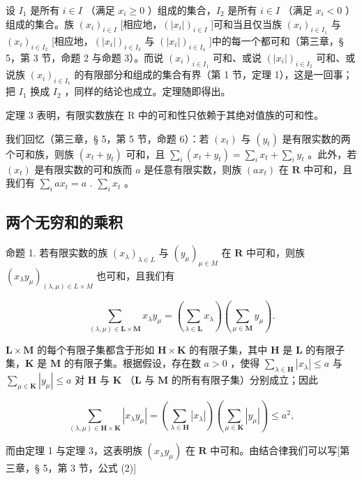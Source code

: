 设 \(I_1\) 是所有 \(i \in I\) （满足 \(x_i \geq 0\) ）组成的集合，\(I_2\) 是所有 \(i \in I\) （满足 \(x_i < 0\) ）组成的集合。族 \((x_i)_{i \in I}\) {[}相应地，\((|x_i|)_{i \in I}\) {]}可和当且仅当族 \((x_i)_{i \in I_1}\) 与 \((x_i)_{i \in I_2}\) {[}相应地，\((|x_i|)_{i \in I_3}\) 与 \((|x_i|)_{i \in I_4}\) {]}中的每一个都可和（第三章，§ 5，第 3 节，命题 2 与命题 3）。而说 \((x_i)_{i \in I_1}\) 可和、或说 \((|x_i|)_{i \in I_2}\) 可和、或说族 \((x_{i})_{i\in I_1}\) 的有限部分和组成的集合有界（第 1 节，定理 1），这是一回事；把 \(I_1\) 换成 \(I_2\) ，同样的结论也成立。定理随即得出。

定理 3 表明，有限实数族在 R 中的可和性只依赖于其绝对值族的可和性。

我们回忆（第三章，§ 5，第 5 节，命题 6）：若 \((x_{t})\) 与 \((y_{t})\) 是有限实数的两个可和族，则族 \((x_{t} + y_{t})\) 可和，且 \(\sum_{i}(x_{t} + y_{t}) = \sum_{i}x_{t} + \sum_{i}y_{t}\) 。此外，若 \((x_{t})\) 是有限实数的可和族而 \(a\) 是任意有限实数，则族 \((ax_{t})\) 在 \(\mathbf{R}\) 中可和，且我们有 \(\sum_{i}ax_{t} = a\) . \(\sum_{i}x_{t}\) 。

\subsection{两个无穷和的乘积}

命题 1. 若有限实数的族 \((x_{\lambda})_{\lambda \in L}\) 与 \((y_{\mu})_{\mu \in M}\) 在 \(\mathbf{R}\) 中可和，则族 \((x_{\lambda}y_{\mu})_{(\lambda ,\mu)\in L\times M}\) 也可和，且我们有

\[
\sum_ {(\lambda , \mu) \in \mathbf {L} \times \mathbf {M}} x _ {\lambda} y _ {\mu} = (\sum_ {\lambda \in \mathbf {L}} x _ {\lambda}) (\sum_ {\mu \in \mathbf {M}} y _ {\mu}).\tag{1}
\]

\(\mathbf{L} \times \mathbf{M}\) 的每个有限子集都含于形如 \(\mathbf{H} \times \mathbf{K}\) 的有限子集，其中 \(\mathbf{H}\) 是 \(\mathbf{L}\) 的有限子集，\(\mathbf{K}\) 是 \(\mathbf{M}\) 的有限子集。根据假设，存在数 \(a > 0\) ，使得 \(\sum_{\lambda \in \mathbf{H}} |x_{\lambda}| \leqslant a\) 与 \(\sum_{\mu \in \mathbf{K}} |y_{\mu}| \leqslant a\) 对 \(\mathbf{H}\) 与 \(\mathbf{K}\) （\(\mathbf{L}\) 与 \(\mathbf{M}\) 的所有有限子集）分别成立；因此

\[
\sum_ {(\lambda , \mu) \in \mathbf {H} \times \mathbf {K}} | x _ {\lambda} y _ {\mu} | = (\sum_ {\lambda \in \mathbf {H}} | x _ {\lambda} |) (\sum_ {\mu \in \mathbf {K}} | y _ {\mu} |) \leqslant a ^ {2},
\]

而由定理 1 与定理 3，这表明族 \((x_{\lambda}y_{\mu})\) 在 \(\mathbf{R}\) 中可和。由结合律我们可以写{[}第三章，§ 5，第 3 节，公式 (2){]}

